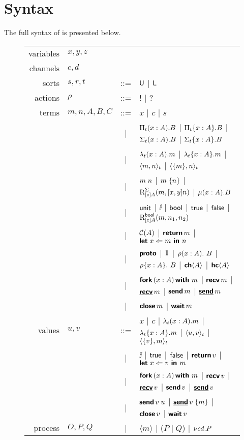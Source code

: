 \section{Syntax}
The full syntax of \TLLC{} is presented below.

\begin{figure}[H]
  \begin{tabular}{r l c l}
    variables & $x, y, z$   &     &                 \\
    channels  & $c, d$      &     &                 \\
    sorts     & $s, r, t$   & ::= & $\textsf{U}$ | $\textsf{L}$   \\
    actions   & $\rho$      & ::= & $!$ | $?$       \\
    terms     & $m,n,A,B,C$ & ::= & $x$ | $c$ | $s$ \\
              &             & \;| & $\Pi_{t}({x : A}).{B}$ | $\Pi_{t}\{{x : A}\}.{B}$
                                    | $\Sigma_{t}({x : A}).{B}$ | $\Sigma_{t}\{{x : A}\}.{B}$ \\
              &             & \;| & $\lambda_{t}({x : A}).{m}$ | $\lambda_{t}\{{x : A}\}.{m}$
                                    | $\langle{{m},{n}}\rangle_{t}$ | $\langle{\{{m}\},{n}}\rangle_{t}$ \\
              &             & \;| & ${m}\;{n}$ | ${m}\;\{{n}\}$ | $\text{R}_{[z]A}^{\Sigma}({m},{[x,y]n})$ | $\mu({x : A}).{B}$ \\
              &             & \;| & $\textsf{unit}$ | $\ii$ | $\textsf{bool}$ | $\textsf{true}$ | $\textsf{false}$
                                    | $\text{R}_{[z]A}^{\textsf{bool}}({m},{n_{1}},{n_{2}})$ \\
              &             & \;| & $\mathcal{C}({A})$ | $\textbf{\textsf{return}}\,{m}$ | $\textbf{\textsf{let}}\;{x}\Leftarrow{m}\textbf{\textsf{ in }}{n}$ \\
              &             & \;| & $\textbf{\textsf{proto}}$ | $\textbf{\textsf{1}}$
                                    | ${{\rho}({x : A}).\ {B}}$ | ${{\rho}\{{x : A}\}.\ {B}}$ | ${\textbf{\textsf{ch}}\langle{A}\rangle}$ | ${\textbf{\textsf{hc}}\langle{A}\rangle}$ \\
              &             & \;| & $\textbf{\textsf{fork}}\,({x : A})\,\textbf{\textsf{with}}\ {m}$ | $\textbf{\textsf{recv}}\,{m}$ | $\underline{\textbf{\textsf{recv}}}\,{m}$
                                    | $\textbf{\textsf{send}}\,{m}$ | $\underline{\textbf{\textsf{send}}}\,{m}$ \\
              &             & \;| & $\textbf{\textsf{close}}\,{m}$ | $\textbf{\textsf{wait}}\,{m}$ \\
    values    & $u, v$      & ::= & $x$ | $c$ | $\lambda_{t}({x : A}).{m}$ | $\lambda_{t}\{{x : A}\}.{m}$
                                    | $\langle{{u},{v}}\rangle_{t}$ | $\langle{\{{v}\},{m}}\rangle_{t}$ \\
              &             & \;| & $\ii$ | $\textsf{true}$ | $\textsf{false}$ | $\textbf{\textsf{return}}\,{v}$ | $\textbf{\textsf{let}}\;{x}\Leftarrow{v}\textbf{\textsf{ in }}{m}$ \\
              &             & \;| & $\textbf{\textsf{fork}}\,({x : A})\,\textbf{\textsf{with}}\ {m}$ | $\textbf{\textsf{recv}}\,{v}$ | $\underline{\textbf{\textsf{recv}}}\,{v}$ | $\textbf{\textsf{send}}\,{v}$ | $\underline{\textbf{\textsf{send}}}\,{v}$ \\
              &             & \;| & ${\textbf{\textsf{send}}\,{v}}\;{u}$ | ${\underline{\textbf{\textsf{send}}}\,{v}}\;\{{m}\}$ | $\textbf{\textsf{close}}\,{v}$ | $\textbf{\textsf{wait}}\,{v}$ \\
    process   & $O, P, Q$   & \;| & $\langle m \rangle$ | ($P \mid Q$) | ${\nu{cd}.{P}}$
  \end{tabular}
\end{figure}

